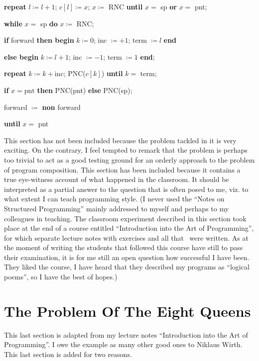 \quad \quad \textbf{repeat} $l\coloneq l + 1$; $c[l]\coloneq x$; $x \coloneq$ RNC \textbf{until} $x =$ sp \textbf{or} $x =$ pnt;

\quad \quad \textbf{while} $x =$ sp \textbf{do} $x\coloneq$ RNC;

\quad \quad \textbf{if} forward \textbf{then begin} $k\coloneq 0$; inc $\coloneq + 1$; term $\coloneq l$ \textbf{end}

\quad \quad\quad \textbf{else begin} $k\coloneq l + 1$; inc $\coloneq -1$; term $\coloneq 1$ \textbf{end};

\quad \quad \textbf{repeat} $k\coloneq k + \text{inc}$; PNC($c[k]$) \textbf{until} $k =$ term;

\quad \quad \textbf{if} $x = \text{pnt}$ \textbf{then} PNC(pnt) \textbf{else} PNC(sp);

\quad \quad forward $\coloneq$ \textbf{non} forward

\quad \textbf{until} $x =$ pnt

This section has not been included because the problem tackled in it is very exciting. On the contrary, I feel tempted to remark that the problem is perhaps too trivial to act as a good testing ground for an orderly approach to the problem of program composition. This section has been included because it contains a true eye-witness account of what happened in the classroom. It should be interpreted as a partial answer to the question that is often posed to me, viz. to what extent I can teach programming style. (I never used the ``Notes on Structured Programming'' \textemdash{}  mainly addressed to myself and perhaps to my colleagues \textemdash{}  in teaching. The classroom experiment described in this section took place at the end of a course entitled ``Introduction into the Art of Programming'', for which separate lecture notes \textemdash{}  with exercises and all \mbox{that \textemdash{} } were written. As at the moment of writing the students that followed this course have still to pass their examination, it is for me still an open question how successful I have been. They liked the course, I have heard that they described my programs as ``logical poems'', so I have the best of hopes.)

\section[The problem of the eight queens]{The Problem Of The Eight Queens}

This last section is adapted from my lecture notes ``Introduction into the Art of Programming''. I owe the example \textemdash{}  as many other good ones \textemdash{}  to Niklaus Wirth. This last section is added for two reasons.

